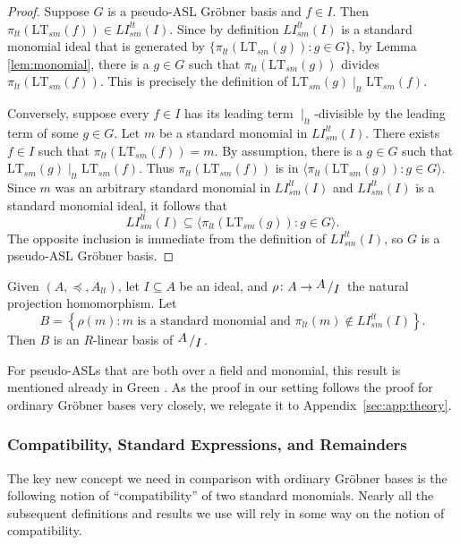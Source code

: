 \documentclass[11pt,reqno]{amsart}
\newcommand{\suchthat}{:}
\newcommand{\bigslant}[2]{{\raisebox{.2em}{$#1$}\left/\raisebox{-.2em}{$#2$}\right.}}
\newcommand{\ltdivides}{\mid_{lt}}
\newcommand{\ltsm}{\text{LT}_{sm}}
\newcommand{\lismlt}{LI_{sm}^{lt}}
\theoremstyle{definition}
\numberwithin{equation}{section}
\begin{document}
\begin{proof}
Suppose $G$ is a pseudo-ASL Gröbner basis and $f \in I$. Then $\pi_{lt}(\ltsm(f)) \in \lismlt(I)$. Since by definition $\lismlt(I)$ is a standard monomial ideal that is generated by $\{\pi_{lt}(\ltsm(g)) \suchthat g \in G \}$, by Lemma \ref{lem:monomial}, there is a $g \in G$ such that $\pi_{lt}(\ltsm(g))$ divides $\pi_{lt}(\ltsm(f))$. This is precisely the definition of $\ltsm(g) \ltdivides \ltsm(f)$.

Conversely, suppose every $f \in I$ has its leading term $\ltdivides$-divisible by the leading term of some $g \in G$. Let $m$ be a standard monomial in $\lismlt(I)$. There exists $f \in I$ such that $\pi_{lt}(\ltsm(f)) = m$. By assumption, there is a $g \in G$ such that $\ltsm(g) \ltdivides \ltsm(f)$. Thus $\pi_{lt}(\ltsm(f))$ is in $\langle \pi_{lt}(\ltsm(g)) \suchthat g \in G \rangle$. Since $m$ was an arbitrary standard monomial in $\lismlt(I)$ and $\lismlt(I)$ is a standard monomial ideal, it follows that 
\[
\lismlt(I) \subseteq \langle \pi_{lt}(\ltsm(g)) \suchthat g \in G \rangle.
\]
The opposite inclusion is immediate from the definition of $\lismlt(I)$, so $G$ is a pseudo-ASL Gröbner basis.
\end{proof}

\begin{theorem}[store=thmmacaulay, note=Pseudo-ASL Analogue of Macaulay's Basis Theorem] \label{thm:macaulay}
Given $(A, \preceq, A_{lt})$, let $I \subseteq A$ be an ideal, and $\rho \colon A \to \bigslant{A}{I}$ the natural projection homomorphism. Let
 \[
 B = \left\{\rho(m) \suchthat m \text{ is a standard monomial and } \pi_{lt}(m) \notin \lismlt(I)\right\}.
 \]
 Then $B$ is an $R$-linear basis of $\bigslant{A}{I}$.
\end{theorem}

For pseudo-ASLs that are both over a field and monomial, this result is mentioned already in Green \cite[p.~36]{green}. As the proof in our setting follows the proof for ordinary Gröbner bases very closely, we relegate it to Appendix~\ref{sec:app:theory}.

\subsubsection{Compatibility, Standard Expressions, and Remainders}

The key new concept we need in comparison with ordinary Gröbner bases is the following notion of ``compatibility'' of two standard monomials. Nearly all the subsequent definitions and results we use will rely in some way on the notion of compatibility.
\end{document}
